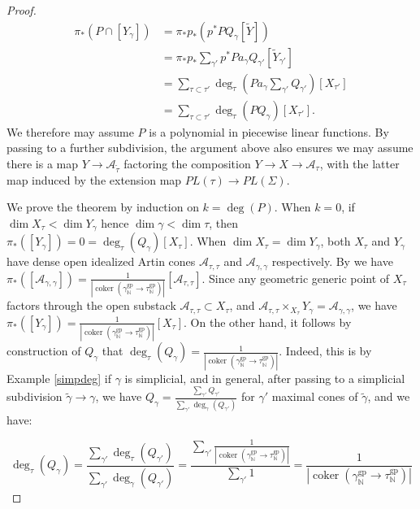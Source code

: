 \documentclass[12pt, oneside]{amsart}   	%
\newcommand{\NN}{\mathbb{N}}
\newcommand{\gp}{\operatorname{gp}}
\newcommand{\coker}{\operatorname{coker}}
\numberwithin{equation}{section}
\numberwithin{thm}{section}
\numberwithin{figure}{section}
\begin{document}
\begin{proof}
\begin{equation}
\begin{split}
\pi_*(P\cap [Y_{\gamma}]) &= \pi_*p_*(p^*P Q_{\gamma} [\widetilde{Y}]) \\
&= \pi_*p_*\sum_{\gamma'} p^*Pa_{\gamma}Q_{\gamma'}[\tilde{Y}_{\gamma'}] \\
&= \sum_{\tau\subset \tau'} \deg_{\tau}(Pa_{\gamma}\sum_{\gamma'}Q_{\gamma'})[X_{\tau'}]\\
&= \sum_{\tau\subset \tau'}\deg_{\tau}(PQ_{\gamma})[X_{\tau'}].
\end{split}
\end{equation}
We therefore may assume $P$ is a polynomial in piecewise linear functions. By passing to a further subdivision, the argument above also ensures we may assume there is a map $Y \rightarrow \mathcal{A}_{\tilde{\tau}}$ factoring the composition $Y \rightarrow X \rightarrow \mathcal{A}_{\tau}$, with the latter map induced by the extension map $PL(\tau) \rightarrow PL(\Sigma)$. 

We prove the theorem by induction on $k = \deg(P)$. When $k = 0$, if $\dim X_{\tau} < \dim Y_{\gamma}$ hence $\dim\gamma < \dim \tau$, then $\pi_*([Y_{\gamma}]) = 0 = \deg_{\tau}(Q_{\gamma})[X_{\tau}]$. When $\dim X_{\tau} = \dim Y_{\gamma}$, both $X_{\tau}$ and $Y_{\gamma}$ have dense open idealized Artin cones $\mathcal{A}_{\tau,\tau}$ and $\mathcal{A}_{\gamma,\gamma}$ respectively. By \cite[Lemma $4.5$]{pbirinv} we have $\pi_*([\mathcal{A}_{\gamma,\gamma}]) = \frac{1}{|\coker(\gamma_{\NN}^{\gp} \rightarrow \tau_{\NN}^{\gp})|}[\mathcal{A}_{\tau,\tau}]$. Since any geometric generic point of $X_{\tau}$ factors through the open substack $\mathcal{A}_{\tau,\tau} \subset X_{\tau}$, and $\mathcal{A}_{\tau,\tau}\times_{X_{\tau}} Y_{\gamma} = \mathcal{A}_{\gamma,\gamma}$, we have $\pi_*([Y_{\gamma}]) = \frac{1}{|\coker(\gamma_{\NN}^{\gp} \rightarrow \tau_{\NN}^{\gp})|}[X_{\tau}]$. On the other hand, it follows by construction of $Q_{\gamma}$ that $\deg_{\tau}(Q_{\gamma}) = \frac{1}{|\coker(\gamma_{\NN}^{\gp} \rightarrow \tau_{\NN}^{\gp})|}$. Indeed, this is by Example \ref{simpdeg} if $\gamma$ is simplicial, and in general, after passing to a simplicial subdivision $\widetilde{\gamma} \rightarrow \gamma$, we have $Q_{\gamma} = \frac{\sum_{\gamma'} Q_{\gamma'}}{\sum_{\gamma'} \deg_{\gamma}(Q_{\gamma'})}$ for $\gamma'$ maximal cones of $\widetilde{\gamma}$, and we have: 

$$\deg_{\tau}(Q_{\gamma}) = \frac{ \sum_{\gamma'} \deg_{\tau}(Q_{\gamma'})}{\sum_{\gamma'}\deg_{\gamma}( Q_{\gamma'})} = \frac{\sum_{\gamma'} \frac{1}{|\coker(\gamma_{\NN}^{\gp} \rightarrow \tau_{\NN}^{\gp})|}}{\sum_{\gamma'} 1} = \frac{1}{|\coker(\gamma_{\NN}^{\gp} \rightarrow \tau_{\NN}^{\gp})|} $$



\end{proof}
\end{document}
